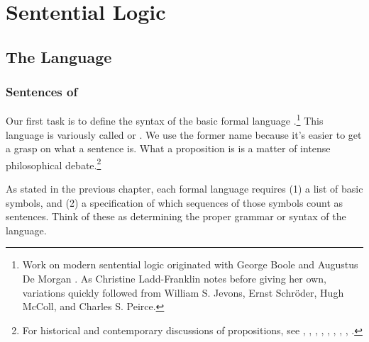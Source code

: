 
\chapter{Sentential Logic}\label{sententiallogic}


\section{The Language \GSL{}}\label{The Language GSL}

\subsection{Sentences of \GSL{}}\label{Sentences of GSL}
Our first task is to define the syntax of the basic formal language \GSL{}.\footnote{Work on modern sentential logic originated with George Boole \citeyearpar{Boole1854} and Augustus De Morgan \citeyearpar{DeMorgan1847,DeMorgan1860}. 
	As Christine Ladd-Franklin notes \citeyearpar[17]{LaddFranklin1883} before giving her own, variations quickly followed from William S. Jevons, Ernst Schr\"oder, Hugh McColl, and Charles S. Peirce.} 
This language is variously called  or . 
We use the former name because it's easier to get a grasp on what a sentence is. What a proposition is is a matter of intense philosophical debate.\footnote{For historical and contemporary discussions of propositions, see \citealt{Frege1892}, \citealt[13,47]{Russell1903}, \citealt[26]{Church1956}, \citealt[ch.~1]{Quine1986}, \citealt[ch.~3]{Schiffer1987}, \citealt{Grandy1993}, \citealt{Bealer1998b}, \citealp{King2007}, \citealt{Soames2010}.}

As stated in the previous chapter, each formal language requires (1) a list of basic symbols, and (2) a specification of which sequences of those symbols count as sentences. Think of these as determining the proper grammar or syntax of the language. 

